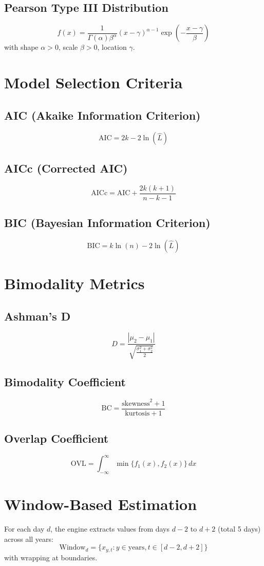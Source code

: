 ﻿\documentclass[12pt,a4paper]{report}
\begin{document}
\subsection{Pearson Type III Distribution}
\[
f(x) = \frac{1}{\Gamma(\alpha)\beta^\alpha} (x-\gamma)^{\alpha-1} \exp\left(-\frac{x-\gamma}{\beta}\right)
\]
with shape $\alpha > 0$, scale $\beta > 0$, location $\gamma$.

\section{Model Selection Criteria}
\subsection{AIC (Akaike Information Criterion)}
\[
\text{AIC} = 2k - 2\ln(\hat{L})
\]
\subsection{AICc (Corrected AIC)}
\[
\text{AICc} = \text{AIC} + \frac{2k(k+1)}{n - k - 1}
\]
\subsection{BIC (Bayesian Information Criterion)}
\[
\text{BIC} = k\ln(n) - 2\ln(\hat{L})
\]

\section{Bimodality Metrics}
\subsection{Ashman's D}
\[
D = \frac{|\mu_2 - \mu_1|}{\sqrt{\frac{\sigma_1^2 + \sigma_2^2}{2}}}
\]
\subsection{Bimodality Coefficient}
\[
\text{BC} = \frac{\text{skewness}^2 + 1}{\text{kurtosis} + 1}
\]
\subsection{Overlap Coefficient}
\[
\text{OVL} = \int_{-\infty}^{\infty} \min\{f_1(x), f_2(x)\} \, dx
\]

\section{Window-Based Estimation}
For each day $d$, the engine extracts values from days $d-2$ to $d+2$ (total 5 days) across all years:
\[
\text{Window}_d = \{x_{y, t} : y \in \text{years}, t \in [d-2, d+2]\}
\]
with wrapping at boundaries.
\end{document}
